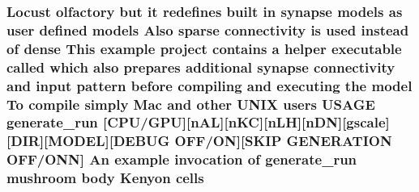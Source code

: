 \hypertarget{userproject_2MBody__userdef__project_2README_8txt_a62f5f9ffc3409d8f12e8b58fdd5ac824}{
\subsubsection[{cells}]{\setlength{\rightskip}{0pt plus 5cm}Locust olfactory but {\bf it} redefines built {\bf in} synapse models as user defined models Also sparse connectivity {\bf is} used instead of dense This example {\bf project} contains a helper executable called which also prepares additional synapse connectivity and input pattern before compiling and executing the {\bf model} To compile simply Mac and other U\+N\+I\+X users U\+S\+A\+G\+E {\bf generate\+\_\+run} \mbox{[}{\bf C\+P\+U}/{\bf G\+P\+U}\mbox{]}\mbox{[}n\+A\+L\mbox{]}\mbox{[}n\+K\+C\mbox{]}\mbox{[}n\+L\+H\mbox{]}\mbox{[}n\+D\+N\mbox{]}\mbox{[}gscale\mbox{]}\mbox{[}D\+I\+R\mbox{]}\mbox{[}M\+O\+D\+E\+L\mbox{]}\mbox{[}D\+E\+B\+U\+G O\+F\+F/O\+N\mbox{]}\mbox{[}S\+K\+I\+P G\+E\+N\+E\+R\+A\+T\+I\+O\+N O\+F\+F/O\+N\+N\mbox{]} An example invocation of {\bf generate\+\_\+run} mushroom body Kenyon cells}}\label{userproject_2MBody__userdef__project_2README_8txt_a62f5f9ffc3409d8f12e8b58fdd5ac824}
